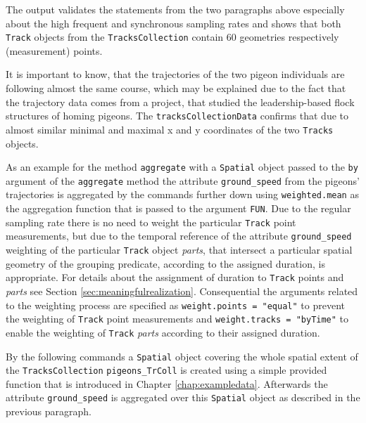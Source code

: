 \documentclass[12pt, oneside, a4paper]{scrbook}
\let\code=\texttt
\begin{document}
The output validates the statements from the two paragraphs above especially about the high frequent and synchronous sampling rates and shows that both \code{Track} objects from the \code{TracksCollection} contain 60 geometries respectively (measurement) points.
\par\medskip

It is important to know, that the trajectories of the two pigeon individuals are following almost the same course, which may be explained due to the fact that the trajectory data comes from a project, that studied the leadership-based flock structures of homing pigeons. The \code{tracksCollectionData} confirms that due to almost similar minimal and maximal x and y coordinates of the two \code{Tracks} objects.
\par\medskip

As an example for the method \code{aggregate} with a \code{Spatial} object passed to the \code{by}  argument of the \code{aggregate} method the attribute \code{ground\_speed} from the pigeons' trajectories is aggregated by the commands further down using \code{weighted.mean} as the aggregation function that is passed to the argument \code{FUN}. 
Due to the regular sampling rate there is no need to weight the particular \code{Track} point measurements, but due to the temporal reference of the attribute \code{ground\_speed} weighting of the particular \code{Track} object \textit{parts}, that intersect a particular spatial geometry of the grouping predicate, according to the assigned duration, is appropriate. For details about the assignment of duration to \code{Track} points and \textit{parts} see Section \ref{sec:meaningfulrealization}. Consequential the arguments related to the weighting process are specified as \code{weight.points = "equal"} to prevent the weighting of \code{Track} point measurements and \code{weight.tracks = "byTime"} to enable the weighting of \code{Track} \textit{parts} according to their assigned duration.
\par\medskip

By the following commands a \code{Spatial} object covering the whole spatial extent of the \code{TracksCollection} \code{pigeons\_TrColl} is created using a simple provided function that is introduced in Chapter \ref{chap:exampledata}. Afterwards the attribute \code{ground\_speed} is aggregated over this \code{Spatial} object as described in the previous paragraph.
\par\medskip
\end{document}
